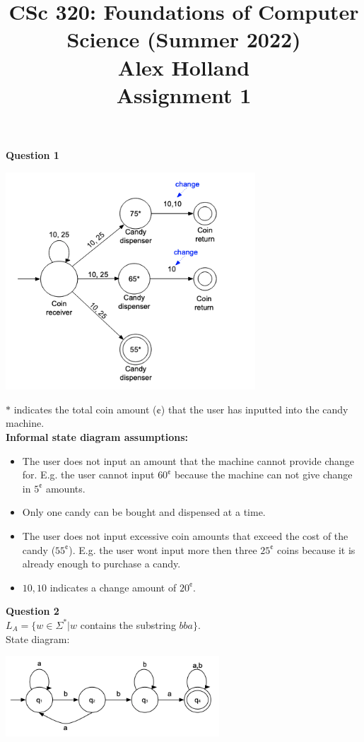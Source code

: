 \documentclass{article}
\title{%
   CSc 320: Foundations of Computer Science (Summer 2022)\\
    \Large Alex Holland\\
    Assignment 1\\
    }
\date{}
\begin{document}
\maketitle

{\bf Question 1}\\

\begin{center}
    \includegraphics[width=0.7\textwidth]{1.png}
\end{center}
$*$ indicates the total coin amount ($\cent$) that the user has inputted into the candy machine.\\

\smallskip
{\bf Informal state diagram assumptions:}
\begin{itemize}
  \item The user does not input an amount that the machine cannot provide change for. E.g. the user cannot input $60^{\cent}$ because the machine can not give change in $5^{\cent}$ amounts.
  \item Only one candy can be bought and dispensed at a time.
  \item The user does not input excessive coin amounts that exceed the cost of the candy ($55^{\cent}$). E.g. the user wont input more then three $25^{\cent}$ coins because it is already enough to purchase a candy.
  \item $10,10$ indicates a change amount of $20^{\cent}$.
\end{itemize}

{\bf Question 2}\\
$L_A=\{w \in \Sigma^* | w$ contains the substring $bba\}$.\\
State diagram:\\
\begin{center}
    \includegraphics[width=0.6\textwidth]{2-1.png}
\end{center}
\end{document}
